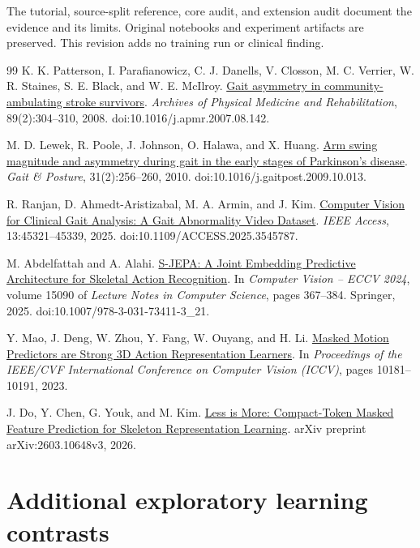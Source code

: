 \documentclass{article}
\begin{document}
The {tutorial}, {source-split reference}, {core audit}, and {extension audit} document the evidence and its limits. Original notebooks and experiment artifacts are preserved. This revision adds no training run or clinical finding.
\label{physworld:main-last}
\clearpage
\label{physworld:references-start}
{\renewcommand{\bibfont}{\small}
\begin{thebibliography}{99}
 K. K. Patterson, I. Parafianowicz, C. J. Danells, V. Closson, M. C. Verrier, W. R. Staines, S. E. Black, and W. E. McIlroy. \href{https://pubmed.ncbi.nlm.nih.gov/18226655/}{Gait asymmetry in community-ambulating stroke survivors}. \emph{Archives of Physical Medicine and Rehabilitation}, 89(2):304--310, 2008. doi:10.1016/j.apmr.2007.08.142.

 M. D. Lewek, R. Poole, J. Johnson, O. Halawa, and X. Huang. \href{https://pubmed.ncbi.nlm.nih.gov/19945285/}{Arm swing magnitude and asymmetry during gait in the early stages of Parkinson's disease}. \emph{Gait \& Posture}, 31(2):256--260, 2010. doi:10.1016/j.gaitpost.2009.10.013.

 R. Ranjan, D. Ahmedt-Aristizabal, M. A. Armin, and J. Kim. \href{https://arxiv.org/abs/2407.04190}{Computer Vision for Clinical Gait Analysis: A Gait Abnormality Video Dataset}. \emph{IEEE Access}, 13:45321--45339, 2025. doi:10.1109/ACCESS.2025.3545787.

 M. Abdelfattah and A. Alahi. \href{https://www.ecva.net/papers/eccv_2024/papers_ECCV/papers/04755.pdf}{S-JEPA: A Joint Embedding Predictive Architecture for Skeletal Action Recognition}. In \emph{Computer Vision -- ECCV 2024}, volume 15090 of \emph{Lecture Notes in Computer Science}, pages 367--384. Springer, 2025. doi:10.1007/978-3-031-73411-3\_21.

 Y. Mao, J. Deng, W. Zhou, Y. Fang, W. Ouyang, and H. Li. \href{https://arxiv.org/abs/2308.07092}{Masked Motion Predictors are Strong 3D Action Representation Learners}. In \emph{Proceedings of the IEEE/CVF International Conference on Computer Vision (ICCV)}, pages 10181--10191, 2023.

 J. Do, Y. Chen, G. Youk, and M. Kim. \href{https://arxiv.org/abs/2603.10648}{Less is More: Compact-Token Masked Feature Prediction for Skeleton Representation Learning}. arXiv preprint arXiv:2603.10648v3, 2026.
\end{thebibliography}
}
\clearpage
\appendix
\label{physworld:appendix-start}
\section{Additional exploratory learning contrasts}\label{appendix-a.-additional-exploratory-learning-contrasts}
\end{document}
